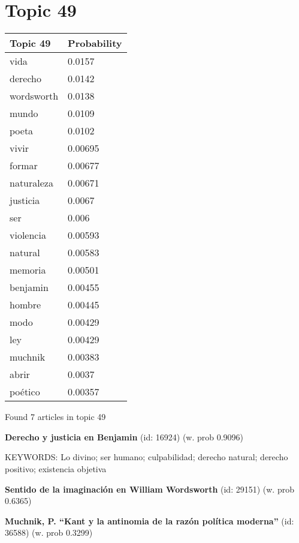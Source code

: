 \documentclass{article}
\begin{document}
\centering
\thispagestyle{empty}
\section*{Topic 49}\vfill
\begin{tabular}{ll}
\toprule
   Topic 49 & Probability \\
\midrule
       vida &      0.0157 \\
    derecho &      0.0142 \\
 wordsworth &      0.0138 \\
      mundo &      0.0109 \\
      poeta &      0.0102 \\
      vivir &     0.00695 \\
     formar &     0.00677 \\
 naturaleza &     0.00671 \\
   justicia &      0.0067 \\
        ser &       0.006 \\
  violencia &     0.00593 \\
    natural &     0.00583 \\
    memoria &     0.00501 \\
   benjamin &     0.00455 \\
     hombre &     0.00445 \\
       modo &     0.00429 \\
        ley &     0.00429 \\
    muchnik &     0.00383 \\
      abrir &      0.0037 \\
    poético &     0.00357 \\
\bottomrule
\end{tabular}

\vfill
Found 7 articles in topic 49
\vfill

\textbf{Derecho y justicia en Benjamin} (id: 16924)
 (w. prob 0.9096)


KEYWORDS:
Lo divino; ser humano; culpabilidad; derecho natural; derecho positivo; existencia objetiva
\vfill

\textbf{Sentido de la imaginación en William Wordsworth} (id: 29151)
 (w. prob 0.6365)
\vfill

\textbf{Muchnik, P. “Kant y la antinomia de la razón política moderna”} (id: 36588)
 (w. prob 0.3299)

\vfill
\newpage


\centering
\thispagestyle{empty}
\end{document}
